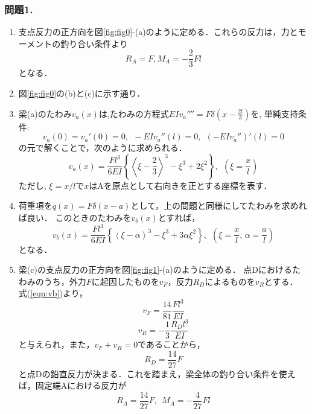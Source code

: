 ﻿\documentclass[10pt,a4j]{jarticle}
\begin{document}
\subsubsection*{問題1.}
\begin{enumerate}
\item
	支点反力の正方向を図\ref{fig:fig0}-(a)のように定める．これらの反力は，力とモーメントの釣り合い条件より
	\begin{equation}
		R_A=F, M_A=-\frac{2}{3}Fl 
		\label{eqn:re_forces}
	\end{equation}
	となる．
\item
	図\ref{fig:fig0}の(b)と(c)に示す通り．
\item
	梁(a)のたわみ$v_a(x)$は,たわみの方程式$EIv_a''''=F\delta\left(x-\frac{2l}{3}\right)$を,
単純支持条件:
\[
	v_a(0)=v_a'(0)=0, \ \ -EIv_a''(l)=0, \ \ (-EIv_a'')'(l)=0
\]
の元で解くことで，次のように求められる．
\begin{equation}
	v_a(x)=
	\frac{Fl^3}{6EI}
	\left\{ \left<\xi -\frac{2}{3}\right>^3-\xi^3+2\xi^2 \right\}, 
	\ \ \left(\xi=\frac{x}{l}\right)
	\label{eqn:va}
\end{equation}
ただし, $\xi=x/l$で$x$はAを原点として右向きを正とする座標を表す．
\item
荷重項を$q(x)=F\delta(x-a)$として，上の問題と同様にしてたわみを求めれば良い．
このときのたわみを$v_b(x)$とすれば，
\begin{equation}
	v_b(x)=
	\frac{Fl^3}{6EI}
	\left\{ \left<\xi -\alpha\right>^3-\xi^3+3\alpha\xi^2 \right\}, 
	\ \ \left(\xi=\frac{x}{l},\, \alpha=\frac{a}{l}\right)
	\label{eqn:vb}
\end{equation}
となる．
\item
梁(c)の支点反力の正方向を図\ref{fig:fig1}-(a)のように定める．
点Dにおけるたわみのうち，外力$F$に起因したものを$v_F$，反力$R_D$によるものを$v_R$とする．
式(\ref{eqn:vb})より，
\begin{equation}
	v_F=\frac{14}{81}\frac{Fl^3}{EI}
	\label{eqn:vF}
\end{equation}
\begin{equation}
	v_R=-\frac{1}{3}\frac{R_Dl^3}{EI}
	\label{eqn:vR}
\end{equation}
と与えられ，また，$v_F+v_R=0$であることから，
\begin{equation}
	R_D=\frac{14}{27}F
	\label{eqn:RB_c}
\end{equation}
と点Dの鉛直反力が決まる．これを踏まえ，梁全体の釣り合い条件を使えば，固定端Aにおける反力が
\begin{equation}
	R_A=\frac{14}{27}F, \ \ M_A=-\frac{4}{27}Fl

\end{equation}
\end{enumerate}
\end{document}
